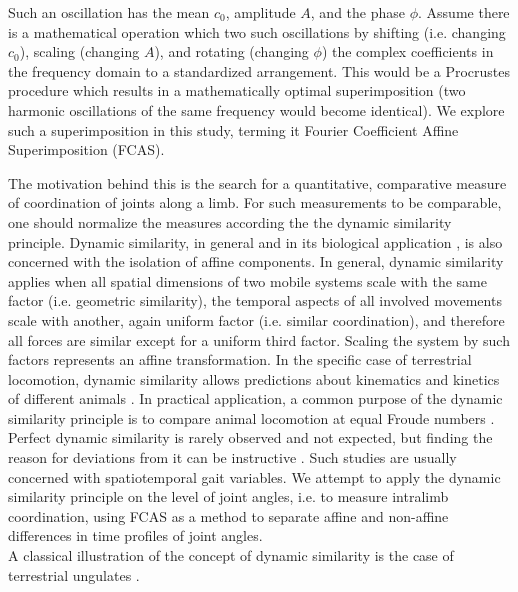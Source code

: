 Such an oscillation has the mean $c_0$, amplitude $A$, and the phase $\phi$.
Assume there is a mathematical operation which  two such oscillations by shifting (i.e. changing $c_0$), scaling (changing $A$), and rotating (changing $\phi$) the complex coefficients in the frequency domain to a standardized arrangement.
This would be a Procrustes procedure which results in a mathematically optimal superimposition (two harmonic oscillations of the same frequency would become identical).
We explore such a superimposition in this study, terming it Fourier Coefficient Affine Superimposition (FCAS).



The motivation behind this is the search for a quantitative, comparative measure of coordination of joints along a limb.
For such measurements to be comparable, one should normalize the measures according the the dynamic similarity principle.
Dynamic similarity, in general and in its biological application \citep[\textit{cf.}][]{Alexander1983,Vaughan2005}, is also concerned with the isolation of affine components.
In general, dynamic similarity applies when all spatial dimensions of two mobile systems scale with the same factor (i.e. geometric similarity), the temporal aspects of all involved movements scale with another, again uniform factor (i.e. similar coordination), and therefore all forces are similar except for a uniform third factor.
Scaling the system by such factors represents an affine transformation.
In the specific case of terrestrial locomotion, dynamic similarity allows predictions about kinematics and kinetics of different animals \citep[i.e. about leg phasing, relative stride length, duty factors, forces and power output;][]{Alexander1983}.
In practical application, a common purpose of the dynamic similarity principle is to compare animal locomotion at equal Froude numbers \citep[e.g.][]{SteudelNumbers2006,Holmes2006}.
Perfect dynamic similarity is rarely observed and not expected, but finding the reason for deviations from it can be instructive \citep[e.g.][]{SteudelNumbers2006,Raichlen2013,Kramer2013}.
Such studies are usually concerned with spatiotemporal gait variables.
We attempt to apply the dynamic similarity principle on the level of joint angles, i.e. to measure intralimb coordination, using FCAS as a method to separate affine and non-affine differences in time profiles of joint angles.
\\A classical illustration of the concept of dynamic similarity is the case of terrestrial ungulates \citep{Alexander1983}.
